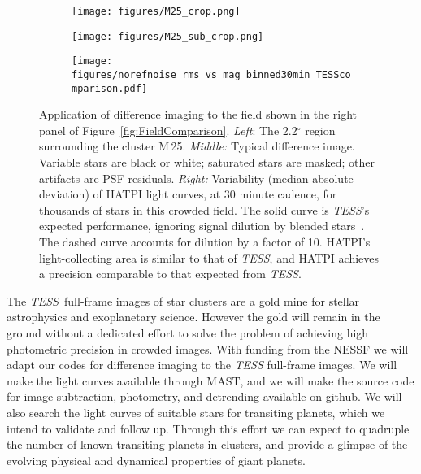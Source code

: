 \documentclass[letterpaper,11pt]{article}
\newcommand{\tess}{{\it TESS}}
\begin{document}
\vspace{-0.3mm}
\begin{figure}[!t]
    \centering
    \begin{subfigure}{.333\textwidth}
        \centering
        \texttt{[image: figures/M25\_crop.png]}
    \end{subfigure}%
    \begin{subfigure}{.333\textwidth}
        \centering
        \texttt{[image: figures/M25\_sub\_crop.png]}
    \end{subfigure}
    \begin{subfigure}{.30\textwidth}
        \centering
        \texttt{[image: figures/norefnoise\_rms\_vs\_mag\_binned30min\_TESScomparison.pdf]}
    \end{subfigure}
    \caption{Application of difference imaging to the field shown in the right 
    panel of Figure~\ref{fig:FieldComparison}.
    {\it Left}: The 2.2$^\circ$ region surrounding the cluster M\,25.
    {\it Middle:} Typical difference image. Variable stars are black 
    or white; saturated stars are masked; other artifacts are PSF residuals.
    {\it Right:} Variability (median absolute deviation) of HATPI light 
    curves, at 30 minute cadence, for thousands of stars in this crowded 
    field. The solid curve is \tess's expected performance, ignoring signal 
    dilution by blended stars~\citep{Sullivan_et_al_2015}. The dashed curve 
    accounts for dilution by a factor of 10.
    HATPI's light-collecting area is similar to that of \tess,
    and HATPI achieves a precision comparable to that expected from \tess.
    }
    \label{fig:hatpi_feasibile}
\end{figure}

\vspace{-0.3mm}
The \tess\ full-frame images of star clusters are a gold mine for
stellar astrophysics and exoplanetary science.  However the gold will
remain in the ground without a dedicated effort to solve the problem
of achieving high photometric precision in crowded images.  With
funding from the NESSF we will adapt our codes for difference
imaging to the {\it TESS} full-frame images.  We will make the light
curves available through MAST, and we will make the source code for
image subtraction, photometry, and detrending available on github. We
will also search the light curves of suitable stars for transiting
planets, which we intend to validate and follow up.  Through this
effort we can expect to quadruple the number of known transiting planets in
clusters, and provide a glimpse of the evolving physical and dynamical
properties of giant planets.
\end{document}
